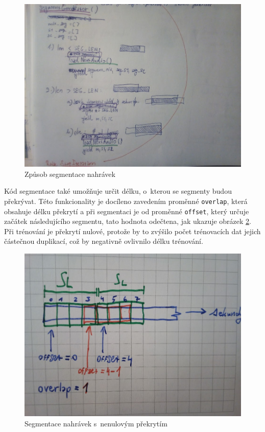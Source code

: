 \begin{figure}[H]
    \centering
    \includegraphics[scale=0.30]{obrazky-figures/segmentation.jpg}
    \caption{\label{fig:generovani_segmentu}Způsob segmentace nahrávek}
\end{figure}


Kód segmentace také umožňuje určit délku, o~kterou se segmenty budou překrývat. Této funkcionality je docíleno zavedením proměnné \texttt{overlap}, která obsahuje délku překrytí a při segmentaci je od proměnné \texttt{offset}, který určuje začátek následujícího segmentu, tato hodnota odečtena, jak ukazuje obrázek \ref{fig:segment_overlap}. Při trénování je překrytí nulové, protože by to zvýšilo počet trénovacích dat jejich částečnou duplikací, což by negativně ovlivnilo délku trénování.

\begin{figure}[H]
    \centering
    \includegraphics[scale=0.25]{obrazky-figures/segment_overlap.jpg}
    \caption{\label{fig:segment_overlap}Segmentace nahrávek s~nenulovým překrytím}
\end{figure}



